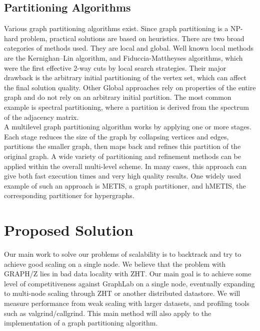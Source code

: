 \documentclass[10pt]{article}
\begin{document}
\begin{multicols}{2}
  \subsection{Partitioning Algorithms}
  Various graph partitioning algorithms exist. Since graph partitioning is a NP-hard problem, practical solutions are based on heuristics. There are two broad categories of methods used. They are local and global. Well known local methods are the Kernighan–Lin algorithm, and Fiduccia-Mattheyses algorithms, which were the first effective 2-way cuts by local search strategies. Their major drawback is the arbitrary initial partitioning of the vertex set, which can affect the final solution quality. Other Global approaches rely on properties of the entire graph and do not rely on an arbitrary initial partition. The most common example is spectral partitioning, where a partition is derived from the spectrum of the adjacency matrix.\\
  A multilevel graph partitioning algorithm works by applying one or more stages. Each stage reduces the size of the graph by collapsing vertices and edges, partitions the smaller graph, then maps back and refines this partition of the original graph. A wide variety of partitioning and refinement methods can be applied within the overall multi-level scheme. In many cases, this approach can give both fast execution times and very high quality results. One widely used example of such an approach is METIS, a graph partitioner, and hMETIS, the corresponding partitioner for hypergraphs.
  
  \section{Proposed Solution}
  Our main work to solve our problems of scalability is to backtrack and try to achieve good scaling on a single node. We believe that the problem with GRAPH/Z lies in bad data locality with ZHT. Our main goal is to achieve some level of competitiveness against GraphLab on a single node, eventually expanding to multi-node scaling through ZHT or another distributed datastore. We will measure performance from weak scaling with larger datasets, and profiling tools such as valgrind/callgrind. This main method will also apply to the implementation of a graph partitioning algorithm.
  

\end{multicols}
\end{document}
